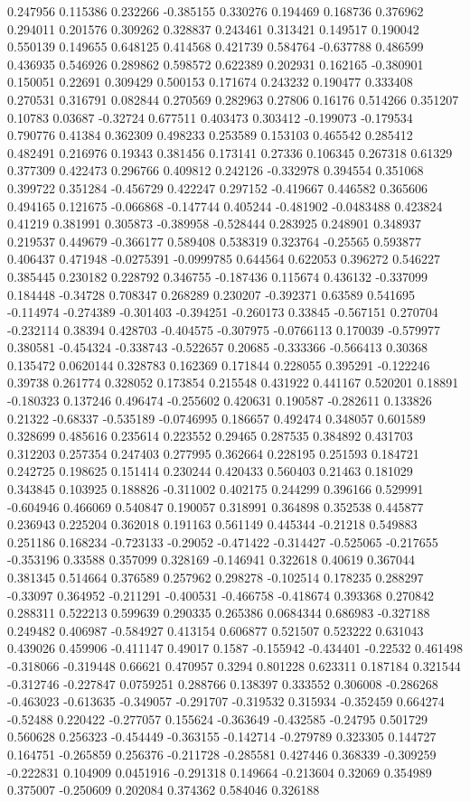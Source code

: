 0.247956 0.115386 0.232266 -0.385155 0.330276 0.194469 0.168736 0.376962 0.294011 0.201576 0.309262 0.328837 0.243461 0.313421 0.149517 0.190042 0.550139 0.149655 0.648125 0.414568 0.421739 0.584764 -0.637788 0.486599 0.436935 0.546926 0.289862 0.598572 0.622389 0.202931 0.162165 -0.380901 0.150051 0.22691 0.309429 0.500153 0.171674 0.243232 0.190477 0.333408 0.270531 0.316791 0.082844 0.270569 0.282963 0.27806 0.16176 0.514266 0.351207 0.10783 0.03687 -0.32724 0.677511 0.403473 0.303412 -0.199073 -0.179534 0.790776 0.41384 0.362309 0.498233 0.253589 0.153103 0.465542 0.285412 0.482491 0.216976 0.19343 0.381456 0.173141 0.27336 0.106345 0.267318 0.61329 0.377309 0.422473 0.296766 0.409812 0.242126 -0.332978 0.394554 0.351068 0.399722 0.351284 -0.456729 0.422247 0.297152 -0.419667 0.446582 0.365606 0.494165 0.121675 -0.066868 -0.147744 0.405244 -0.481902 -0.0483488 0.423824 0.41219 0.381991 0.305873 -0.389958 -0.528444 0.283925 0.248901 0.348937 0.219537 0.449679 -0.366177 0.589408 0.538319 0.323764 -0.25565 0.593877 0.406437 0.471948 -0.0275391 -0.0999785 0.644564 0.622053 0.396272 0.546227 0.385445 0.230182 0.228792 0.346755 -0.187436 0.115674 0.436132 -0.337099 0.184448 -0.34728 0.708347 0.268289 0.230207 -0.392371 0.63589 0.541695 -0.114974 -0.274389 -0.301403 -0.394251 -0.260173 0.33845 -0.567151 0.270704 -0.232114 0.38394 0.428703 -0.404575 -0.307975 -0.0766113 0.170039 -0.579977 0.380581 -0.454324 -0.338743 -0.522657 0.20685 -0.333366 -0.566413 0.30368 0.135472 0.0620144 0.328783 0.162369 0.171844 0.228055 0.395291 -0.122246 0.39738 0.261774 0.328052 0.173854 0.215548 0.431922 0.441167 0.520201 0.18891 -0.180323 0.137246 0.496474 -0.255602 0.420631 0.190587 -0.282611 0.133826 0.21322 -0.68337 -0.535189 -0.0746995 0.186657 0.492474 0.348057 0.601589 0.328699 0.485616 0.235614 0.223552 0.29465 0.287535 0.384892 0.431703 0.312203 0.257354 0.247403 0.277995 0.362664 0.228195 0.251593 0.184721 0.242725 0.198625 0.151414 0.230244 0.420433 0.560403 0.21463 0.181029 0.343845 0.103925 0.188826 -0.311002 0.402175 0.244299 0.396166 0.529991 -0.604946 0.466069 0.540847 0.190057 0.318991 0.364898 0.352538 0.445877 0.236943 0.225204 0.362018 0.191163 0.561149 0.445344 -0.21218 0.549883 0.251186 0.168234 -0.723133 -0.29052 -0.471422 -0.314427 -0.525065 -0.217655 -0.353196 0.33588 0.357099 0.328169 -0.146941 0.322618 0.40619 0.367044 0.381345 0.514664 0.376589 0.257962 0.298278 -0.102514 0.178235 0.288297 -0.33097 0.364952 -0.211291 -0.400531 -0.466758 -0.418674 0.393368 0.270842 0.288311 0.522213 0.599639 0.290335 0.265386 0.0684344 0.686983 -0.327188 0.249482 0.406987 -0.584927 0.413154 0.606877 0.521507 0.523222 0.631043 0.439026 0.459906 -0.411147 0.49017 0.1587 -0.155942 -0.434401 -0.22532 0.461498 -0.318066 -0.319448 0.66621 0.470957 0.3294 0.801228 0.623311 0.187184 0.321544 -0.312746 -0.227847 0.0759251 0.288766 0.138397 0.333552 0.306008 -0.286268 -0.463023 -0.613635 -0.349057 -0.291707 -0.319532 0.315934 -0.352459 0.664274 -0.52488 0.220422 -0.277057 0.155624 -0.363649 -0.432585 -0.24795 0.501729 0.560628 0.256323 -0.454449 -0.363155 -0.142714 -0.279789 0.323305 0.144727 0.164751 -0.265859 0.256376 -0.211728 -0.285581 0.427446 0.368339 -0.309259 -0.222831 0.104909 0.0451916 -0.291318 0.149664 -0.213604 0.32069 0.354989 0.375007 -0.250609 0.202084 0.374362 0.584046 0.326188 